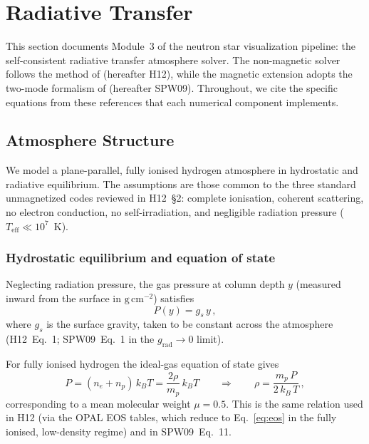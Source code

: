 \section{Radiative Transfer}
\label{sec:radiative_transfer}

This section documents Module~3 of the neutron star visualization pipeline: the self-consistent radiative transfer atmosphere solver. The non-magnetic solver follows the method of \citet{haakonsen2012} (hereafter H12), while the magnetic extension adopts the two-mode formalism of \citet{suleimanov2009} (hereafter SPW09). Throughout, we cite the specific equations from these references that each numerical component implements.

\subsection{Atmosphere Structure}
\label{sec:atm_structure}

We model a plane-parallel, fully ionised hydrogen atmosphere in hydrostatic and radiative equilibrium. The assumptions are those common to the three standard unmagnetized codes reviewed in H12~\S2: complete ionisation, coherent scattering, no electron conduction, no self-irradiation, and negligible radiation pressure ($T_\mathrm{eff}\ll10^7$~K).

\subsubsection{Hydrostatic equilibrium and equation of state}

Neglecting radiation pressure, the gas pressure at column depth $y$ (measured inward from the surface in $\mathrm{g\,cm^{-2}}$) satisfies
\begin{equation}
  P(y) = g_s\, y \,,
  \label{eq:hydrostatic}
\end{equation}
where $g_s$ is the surface gravity, taken to be constant across the atmosphere (H12~Eq.~1; SPW09~Eq.~1 in the $g_\mathrm{rad}\to 0$ limit).

For fully ionised hydrogen the ideal-gas equation of state gives
\begin{equation}
  P = (n_e + n_p)\,k_B T = \frac{2\rho}{m_p}\,k_B T
  \qquad\Longrightarrow\qquad
  \rho = \frac{m_p\,P}{2\,k_B\,T}\,,
  \label{eq:eos}
\end{equation}
corresponding to a mean molecular weight $\mu = 0.5$. This is the same relation used in H12 (via the OPAL EOS tables, which reduce to Eq.~\eqref{eq:eos} in the fully ionised, low-density regime) and in SPW09~Eq.~11.

